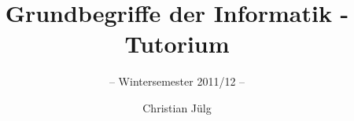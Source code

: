 
\title{Grundbegriffe der Informatik - Tutorium}
\subtitle{-- Wintersemester 2011/12 --}
\author{Christian Jülg}
